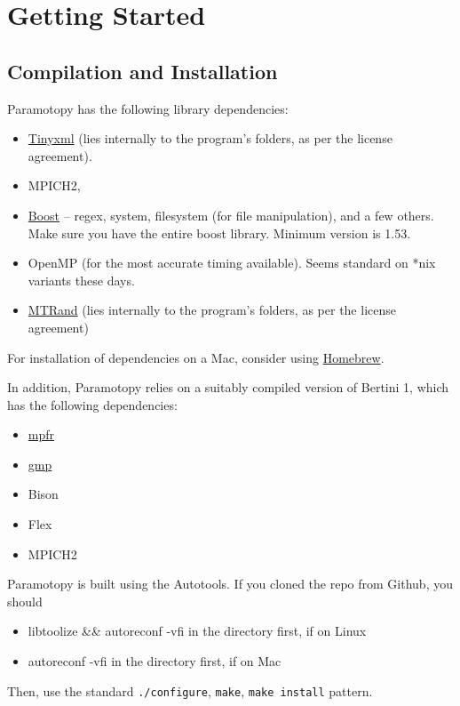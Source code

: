 \clearpage
\section{Getting Started}
\label{sec:started}

\subsection{Compilation and Installation}

Paramotopy has the following library dependencies: 
\begin{itemize}
\item \href{http://sourceforge.net/projects/tinyxml/}{Tinyxml}  (lies internally to the program's folders, as per the license agreement).
\item MPICH2,
\item  \href{http://www.boost.org/}{Boost} -- regex, system, filesystem (for file manipulation), and a few others.  Make sure you have the entire boost library.  Minimum version is 1.53.
\item OpenMP (for the most accurate timing available).  Seems standard on *nix variants these days.
\item \href{http://www.bedaux.net/mtrand/}{MTRand} (lies internally to the program's folders, as per the license agreement)
\end{itemize}
\noindent For installation of dependencies on a Mac, consider using \href{http://mxcl.github.io/homebrew/}{Homebrew}.
\vspace{10mm}

\noindent In addition, Paramotopy relies on a suitably compiled version of Bertini 1, which has the following dependencies:
\begin{itemize}
\item \href{http://www.mpfr.org/}{mpfr} 
\item \href{http://gmplib.org/}{gmp}
\item Bison
\item Flex
\item MPICH2
\end{itemize}


Paramotopy is built using the Autotools.  If you cloned the repo from Github, you should 
\begin{itemize}
\item {libtoolize \&\& autoreconf -vfi} in the directory first, if on Linux
\item {autoreconf -vfi} in the directory first, if on Mac
\end{itemize}
Then, use the standard {\tt ./configure}, {\tt make}, {\tt make install} pattern.  

